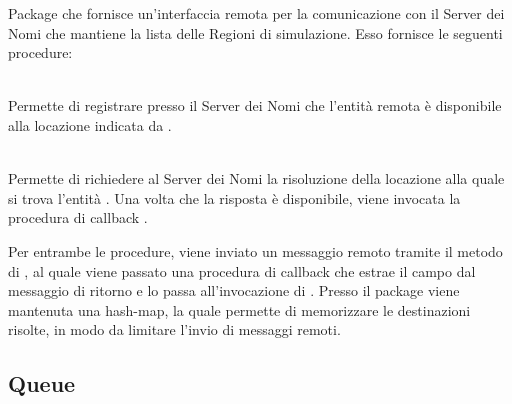 	Package che fornisce un'interfaccia remota per la comunicazione con il Server dei Nomi che mantiene la lista delle Regioni di simulazione. Esso fornisce le seguenti procedure:
	\begin{description}
		\item {} \\
	Permette di registrare presso il Server dei Nomi che l'entità remota  è disponibile alla locazione indicata da . 
	
	\item {} \\
		Permette di richiedere al Server dei Nomi la risoluzione della locazione alla quale si trova l'entità . Una volta che la risposta è disponibile, viene invocata la procedura di callback . 
				
	\end{description}
	
	Per entrambe le procedure, viene inviato un messaggio remoto tramite il metodo  di , al quale viene passato una procedura di callback che estrae il campo  dal messaggio di ritorno e lo passa all'invocazione di . Presso il package viene mantenuta una hash-map, la quale permette di memorizzare le destinazioni risolte, in modo da limitare l'invio di messaggi remoti.
	
	\subsection{Queue}
	
